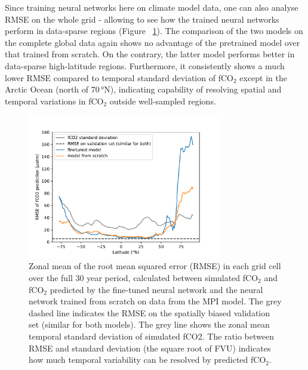 \documentclass{article}
\begin{document}
	Since training neural networks here on climate model data, one can also analyse RMSE on the whole grid - allowing to see how the trained neural networks perform in data-sparse regions (Figure ~\ref{fig:global-rmse}). The comparison of the two models on the complete global data again shows no advantage of the pretrained model over that trained from scratch. On the contrary, the latter model performs better in data-sparse high-latitude regions. Furthermore, it consistently shows a much lower RMSE compared to temporal standard deviation of fCO$_2$ except in the Arctic Ocean (north of 70\,°N), indicating capability of resolving spatial and temporal variations in fCO$_2$ outside well-sampled regions.  \\
	
	\begin{figure}
	\centering
	\includegraphics[width=0.75\textwidth]{./figures/MPI-ESM_global_model_rmse.pdf}
	\caption{Zonal mean of the root mean squared error (RMSE) in each grid cell over the full 30 year period, calculated between simulated fCO$_2$ and fCO$_2$ predicted by the fine-tuned neural network and the neural network trained from scratch on data from the MPI model. The grey dashed line indicates the RMSE on the spatially biased validation set (similar for both models). The grey line shows the zonal mean temporal standard deviation of simulated fCO2. The ratio between RMSE and standard deviation (the square root of FVU) indicates how much temporal variability can be resolved by predicted fCO$_2$.}
	\label{fig:global-rmse}
	\end{figure} 
	
\end{document}
